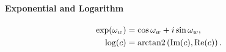 \begin{properties}[breakable, title={$\Uone$ as a parameterization of $\SOtwo$}]
  \paragraph{Exponential and Logarithm}
  \begin{subequations}
    \begin{align}
      \label{eq:u1_exp}
      \exp (\omega_w) & = \cos \omega_{w} + i \sin \omega_{w},                   \\
      \label{eq:u1_log}
      \log (c)        & = \operatorname{arctan2}\left(\textrm{Im}(c), \textrm{Re}(c)\right).
    \end{align}
  \end{subequations}
\end{properties}

